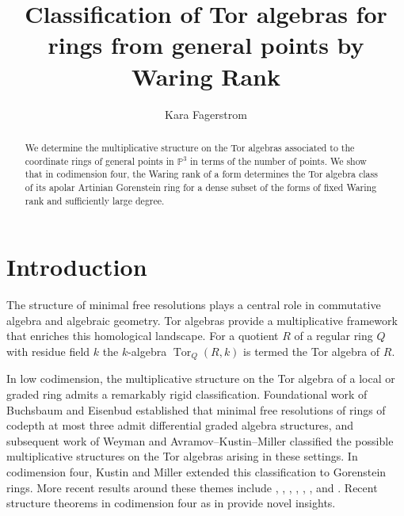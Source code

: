 \documentclass[reqno]{amsart}
\title[Tor algebras classified by Waring rank]{Classification of Tor algebras for rings from general points by Waring Rank}
\author{Kara Fagerstrom}
\DeclareMathOperator{\Tor}{Tor}
\theoremstyle{plain} %
\theoremstyle{definition}
\theoremstyle{remark}
\begin{document}
\begin{abstract}
    We determine the multiplicative structure on the Tor algebras associated to the coordinate rings of general
points in $\mathbb{P}^3$ in terms of the number of points. 
We show that  in codimension 
four, the Waring rank of a form   determines the Tor algebra class of its apolar Artinian Gorenstein ring for a dense subset of the forms of fixed Waring rank and sufficiently large degree.
\end{abstract}

\maketitle

\section{Introduction}

The structure of minimal free resolutions plays a central role in commutative algebra and algebraic geometry.  Tor algebras provide a multiplicative framework that enriches this homological landscape. For a quotient $R$ of a regular ring $Q$ with residue field $k$  the $k$-algebra $\Tor_Q(R,k)$ is termed the Tor algebra of $R$.

In low
codimension, the multiplicative structure on the Tor algebra of a local or graded
ring admits a remarkably rigid classification. Foundational work of
Buchsbaum and Eisenbud \cite{BuchsbaumEisenbud} established that minimal free resolutions of rings of
codepth at most three admit differential graded algebra structures, and subsequent
work of Weyman \cite{Weyman} and Avramov--Kustin--Miller \cite{AKM-codepth3} classified the possible
multiplicative structures on the Tor algebras arising in these settings. In codimension four,
Kustin and Miller \cite{Kustin_Miller_Codepth4class} extended this classification to Gorenstein rings. More recent results around these themes include \cite{Avramov}, \cite{ChristensenVeliche14}, \cite{ChristensenVelicheWeyman19},  \cite{ChristensenVelicheWeyman20}, \cite{VandeBogert21}, \cite{VandeBogert22}, \cite{ChristensenVeliche23} and \cite{Hardesty}. Recent structure theorems in codimension four as in \cite{Gor_Six_Gen} provide novel insights. 
\end{document}

